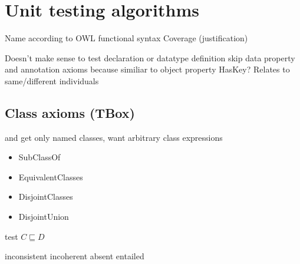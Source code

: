 \documentclass[paper.tex]{subfiles}
\begin{document}
\section{Unit testing algorithms}
\label{sec:algorithms}

\begin{todos}
  \todo Name according to OWL functional syntax
  \todo Coverage (justification)
  \begin{todos}
    \todo Doesn't make sense to test declaration or data\-type definition
    \todo skip data property and annotation axioms because similiar to object property
    \todo HasKey?  Relates to same/different individuals
  \end{todos}
\end{todos}

\subsection{Class axioms (TBox)}

\begin{todos}
  \todo {} and  get only named classes, want arbitrary class expressions
\end{todos}

\begin{itemize}[noitemsep]
  \ttfamily
  \item SubClassOf
  \item EquivalentClasses
  \item DisjointClasses
  \item DisjointUnion
\end{itemize}

\begin{algorithm}[H]
  \caption{test $C \sqsubseteq D$}
  \begin{algorithmic}[1]
    \raggedright
        \State \Return inconsistent
        \State \Return incoherent
        \State \Return absent
      \Else
        \State \Return entailed
        \label{alg:testSubClassOf:returnEntailed}
      \EndIf
    \EndFunction
  \end{algorithmic}
\end{algorithm}
\end{document}
